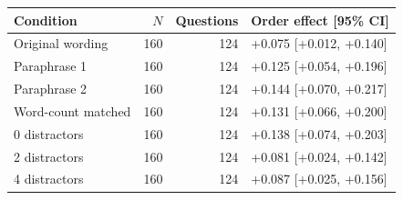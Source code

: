 \begin{tabular}{lrrl}
\toprule
Condition & $N$ & Questions & Order effect [95\% CI] \\
\midrule
Original wording & 160 & 124 & +0.075 [+0.012, +0.140] \\
Paraphrase 1 & 160 & 124 & +0.125 [+0.054, +0.196] \\
Paraphrase 2 & 160 & 124 & +0.144 [+0.070, +0.217] \\
Word-count matched & 160 & 124 & +0.131 [+0.066, +0.200] \\
0 distractors & 160 & 124 & +0.138 [+0.074, +0.203] \\
2 distractors & 160 & 124 & +0.081 [+0.024, +0.142] \\
4 distractors & 160 & 124 & +0.087 [+0.025, +0.156] \\
\bottomrule
\end{tabular}
